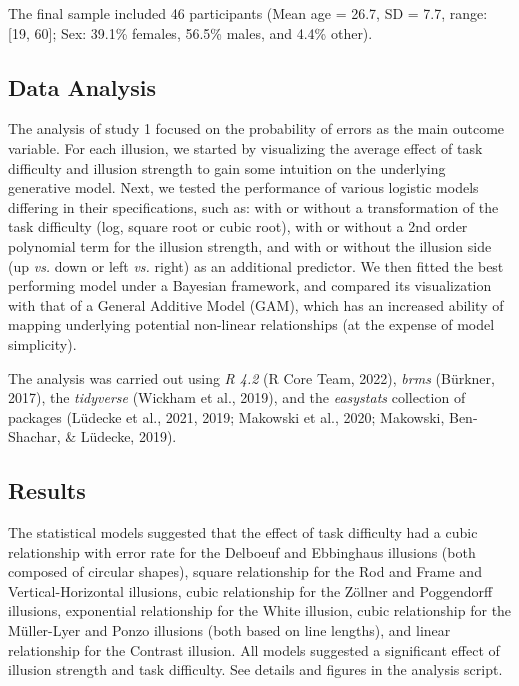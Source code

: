 \documentclass[
  man,floatsintext]{apa6}
\begin{document}
The final sample included 46 participants (Mean age = 26.7, SD = 7.7, range: {[}19, 60{]}; Sex: 39.1\% females, 56.5\% males, and 4.4\% other).

\hypertarget{data-analysis}{%
\subsection{Data Analysis}\label{data-analysis}}

The analysis of study 1 focused on the probability of errors as the main outcome variable. For each illusion, we started by visualizing the average effect of task difficulty and illusion strength to gain some intuition on the underlying generative model. Next, we tested the performance of various logistic models differing in their specifications, such as: with or without a transformation of the task difficulty (log, square root or cubic root), with or without a 2nd order polynomial term for the illusion strength, and with or without the illusion side (up \emph{vs.} down or left \emph{vs.} right) as an additional predictor. We then fitted the best performing model under a Bayesian framework, and compared its visualization with that of a General Additive Model (GAM), which has an increased ability of mapping underlying potential non-linear relationships (at the expense of model simplicity).

The analysis was carried out using \emph{R 4.2} (R Core Team, 2022), \emph{brms} (Bürkner, 2017), the \emph{tidyverse} (Wickham et al., 2019), and the \emph{easystats} collection of packages (Lüdecke et al., 2021, 2019; Makowski et al., 2020; Makowski, Ben-Shachar, \& Lüdecke, 2019).

\hypertarget{results}{%
\subsection{Results}\label{results}}

The statistical models suggested that the effect of task difficulty had a cubic relationship with error rate for the Delboeuf and Ebbinghaus illusions (both composed of circular shapes), square relationship for the Rod and Frame and Vertical-Horizontal illusions, cubic relationship for the Zöllner and Poggendorff illusions, exponential relationship for the White illusion, cubic relationship for the Müller-Lyer and Ponzo illusions (both based on line lengths), and linear relationship for the Contrast illusion. All models suggested a significant effect of illusion strength and task difficulty. See details and figures in the analysis script.
\end{document}
